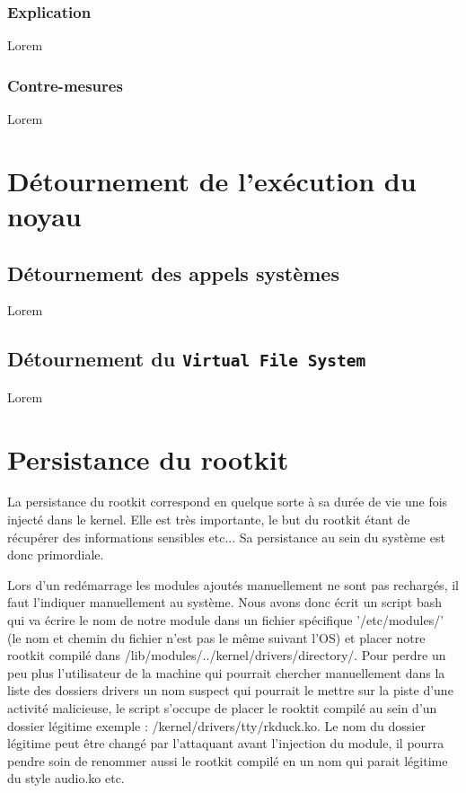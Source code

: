 \documentclass[11pt]{article}
\begin{document}
		\subsubsection{Explication}
			Lorem
		\subsubsection{Contre-mesures}
			Lorem
	
\section{Détournement de l'exécution du noyau}	

	\subsection{Détournement des appels systèmes}
	Lorem
	\subsection{ Détournement du \texttt{Virtual File System}}
	Lorem
\section{Persistance du rootkit}
	
	La persistance du rootkit correspond en quelque sorte à sa durée de vie une fois injecté dans le kernel. Elle est très importante, le but du rootkit étant de récupérer des informations sensibles etc... Sa persistance au sein du système est donc primordiale. 
	
	Lors d'un redémarrage les modules ajoutés manuellement ne sont pas rechargés, il faut l'indiquer manuellement au système. Nous avons donc écrit un script bash qui va écrire le nom de notre module dans un fichier spécifique '/etc/modules/' (le nom et chemin du fichier n'est pas le même suivant l'OS) et placer notre rootkit compilé dans /lib/modules/../kernel/drivers/directory/. Pour perdre un peu plus l'utilisateur de la machine qui pourrait chercher manuellement dans la liste des dossiers drivers un nom suspect qui pourrait le mettre sur la piste d'une activité malicieuse, le script s'occupe de placer le rooktit compilé au sein d'un dossier légitime exemple : /kernel/drivers/tty/rkduck.ko. Le nom du dossier légitime peut être changé par l'attaquant avant l'injection du module, il pourra pendre soin de renommer aussi le rootkit compilé en un nom qui parait légitime du style audio.ko etc.
	
\end{document}
